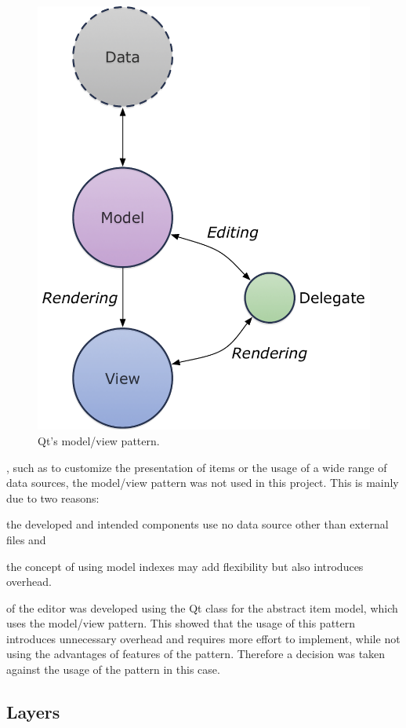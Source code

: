 \documentclass[%
    a4paper,    %
    justified,  %
    nobib,      %
    openany     %
]{tufte-book}
\makeatletter
\renewcommand{\label}[1]{\@tufte@label{##1}}%
\makeatother
\begin{document}
\begin{figure}[ht]
  \includegraphics[width=0.6\linewidth]{images/model-view-pattern}
  \caption{Qt's model/view pattern.~\cite{qt-mvp-2017}}
  \label{fig:software-design-pattern-qt-mvp}
\end{figure}

, such as to customize the presentation
of items or the usage of a wide range of data sources, the model/view pattern was
not used in this project. This is mainly due to two reasons:
\begin{enumerate*}
  \item the developed and intended components use no data source other than external
    files and
  \item the concept of using model indexes may add flexibility but also
    introduces overhead.
\end{enumerate*}

 of the editor was developed using the Qt
class for the abstract item model, which uses the model/view pattern. This
showed that the usage of this pattern introduces unnecessary overhead and
requires more effort to implement, while not using the advantages of features of
the pattern. Therefore a decision was taken against the usage of the pattern in
this case.

\subsection{Layers}
\label{results:subsec:layers}
\end{document}
